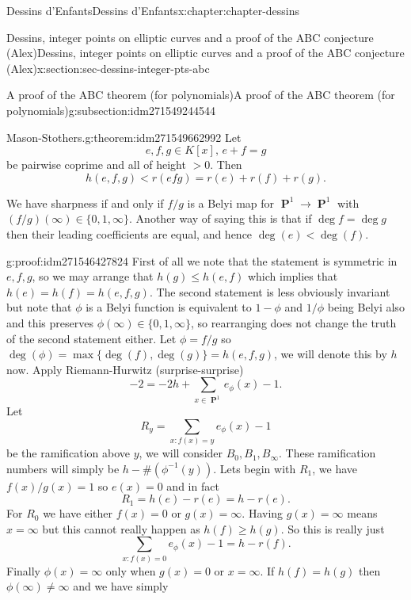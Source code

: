 \documentclass[oneside,10pt,]{book}
\numberwithin{equation}{section}
\newcommand{\inv}{^{-1}}
\DeclareMathOperator{\PP}{\mathbf{P}}
\newcommand{\lt}{<}
\newcommand{\gt}{>}
\begin{document}
\begin{chapterptx}{Dessins d'Enfants}{}{Dessins d'Enfants}{}{}{x:chapter:chapter-dessins}
\begin{sectionptx}{Dessins, integer points on elliptic curves and a proof of the ABC conjecture (Alex)}{}{Dessins, integer points on elliptic curves and a proof of the ABC conjecture (Alex)}{}{}{x:section:sec-dessins-integer-pts-abc}
\begin{subsectionptx}{A proof of the ABC theorem (for polynomials)}{}{A proof of the ABC theorem (for polynomials)}{}{}{g:subsection:idm271549244544}
\begin{theorem}{Mason-Stothers.}{}{g:theorem:idm271549662992}
Let%
\begin{equation*}
e,f,g\in K[x],\,e + f = g
\end{equation*}
be pairwise coprime and all of height \(\gt 0\). Then%
\begin{equation*}
h(e,f,g) \lt r(efg) = r(e) + r(f)  + r(g)\text{.}
\end{equation*}
%
\par
We have sharpness if and only if \(f/g\) is a Belyi map for \(\PP^1 \to \PP^1\) with \((f/g)(\infty) \in \{0,1,\infty\}\). Another way of saying this is that if \(\deg f = \deg g\) then their leading coefficients are equal, and hence \(\deg (e) \lt \deg (f)\).%
\end{theorem}
\begin{proofptx}{}{g:proof:idm271546427824}
First of all we note that the statement is symmetric in \(e,f,g\), so we may arrange that \(h(g) \le h(e,f)\) which implies that \(h(e) = h(f) = h(e,f,g)\). The second statement is less obviously invariant but note that \(\phi\) is  a Belyi function is equivalent to \(1-\phi\) and \(1/\phi\) being Belyi also and this preserves \(\phi(\infty) \in \{0,1,\infty\}\), so rearranging does not change the truth of the second statement either. Let \(\phi = f/g\) so \(\deg(\phi) = \max\{\deg (f), \deg(g)\} = h(e,f,g)\), we will denote this by \(h\) now. Apply Riemann-Hurwitz (surprise-surprise)%
\begin{equation*}
-2 = -2h + \sum_{x\in \PP^1} e_\phi(x) - 1\text{.}
\end{equation*}
Let%
\begin{equation*}
R_y = \sum_{x : f(x) = y} e_\phi(x) - 1
\end{equation*}
be the ramification above \(y\), we will consider \(B_0, B_1, B_\infty\). These ramification numbers will simply be \(h - \#(\phi\inv(y))\). Lets begin with \(R_1\), we have \(f(x)/g(x) = 1\) so \(e(x) = 0\) and in fact%
\begin{equation*}
R_1 = h(e) - r(e) = h - r(e)\text{.}
\end{equation*}
For \(R_0\) we have either \(f(x) = 0\) or \(g(x) = \infty\). Having \(g(x) = \infty\) means \(x = \infty\) but this cannot really happen as \(h(f) \ge h(g)\). So this is really just%
\begin{equation*}
\sum_{x : f(x) = 0} e_\phi(x) - 1 = h  - r(f)\text{.}
\end{equation*}
Finally \(\phi(x) = \infty\) only when \(g(x) = 0\) or \(x = \infty\). If \(h(f) = h(g)\) then \(\phi(\infty) \ne \infty\) and we have simply%
\begin{equation*}

\end{equation*}
\end{proofptx}
\end{subsectionptx}
\end{sectionptx}
\end{chapterptx}
\end{document}
